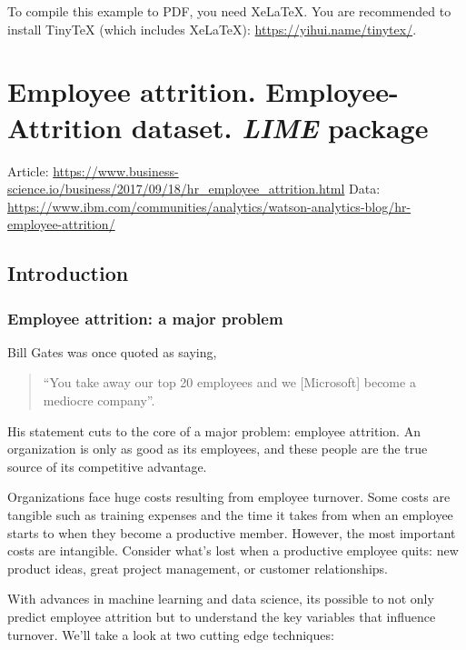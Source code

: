 \documentclass[]{book}
\begin{document}
To compile this example to PDF, you need XeLaTeX. You are recommended to install TinyTeX (which includes XeLaTeX): \url{https://yihui.name/tinytex/}.

\hypertarget{employee-attrition.-employee-attrition-dataset.-lime-package}{%
\chapter{\texorpdfstring{Employee attrition. Employee-Attrition dataset. \emph{LIME} package}{Employee attrition. Employee-Attrition dataset. LIME package}}\label{employee-attrition.-employee-attrition-dataset.-lime-package}}

Article: \url{https://www.business-science.io/business/2017/09/18/hr_employee_attrition.html}
Data: \url{https://www.ibm.com/communities/analytics/watson-analytics-blog/hr-employee-attrition/}

\hypertarget{introduction}{%
\section{Introduction}\label{introduction}}

\hypertarget{employee-attrition-a-major-problem}{%
\subsection{Employee attrition: a major problem}\label{employee-attrition-a-major-problem}}

Bill Gates was once quoted as saying,

\begin{quote}
``You take away our top 20 employees and we {[}Microsoft{]} become a mediocre company''.
\end{quote}

His statement cuts to the core of a major problem: employee attrition. An organization is only as good as its employees, and these people are the true source of its competitive advantage.

Organizations face huge costs resulting from employee turnover. Some costs are tangible such as training expenses and the time it takes from when an employee starts to when they become a productive member. However, the most important costs are intangible. Consider what's lost when a productive employee quits: new product ideas, great project management, or customer relationships.

With advances in machine learning and data science, its possible to not only predict employee attrition but to understand the key variables that influence turnover. We'll take a look at two cutting edge techniques:
\end{document}
